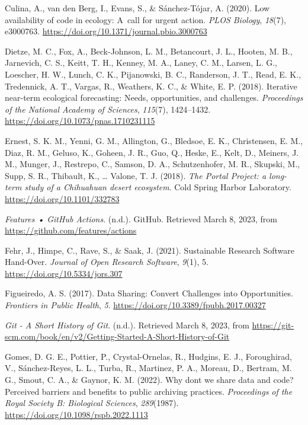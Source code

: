 \begin{CSLReferences}{1}{0}
\leavevmode{}%
Culina, A., van den Berg, I., Evans, S., \& Sánchez-Tójar, A. (2020). Low availability of code in ecology: A~call for urgent action. \emph{PLOS Biology}, \emph{18}(7), e3000763. \url{https://doi.org/10.1371/journal.pbio.3000763}

\leavevmode{}%
Dietze, M. C., Fox, A., Beck-Johnson, L. M., Betancourt, J. L., Hooten, M. B., Jarnevich, C. S., Keitt, T. H., Kenney, M. A., Laney, C. M., Larsen, L. G., Loescher, H. W., Lunch, C. K., Pijanowski, B. C., Randerson, J. T., Read, E. K., Tredennick, A. T., Vargas, R., Weathers, K. C., \& White, E. P. (2018). Iterative near-term ecological forecasting: Needs, opportunities, and challenges. \emph{Proceedings of the National Academy of Sciences}, \emph{115}(7), 1424--1432. \url{https://doi.org/10.1073/pnas.1710231115}

\leavevmode{}%
Ernest, S. K. M., Yenni, G. M., Allington, G., Bledsoe, E. K., Christensen, E. M., Diaz, R. M., Geluso, K., Goheen, J. R., Guo, Q., Heske, E., Kelt, D., Meiners, J. M., Munger, J., Restrepo, C., Samson, D. A., Schutzenhofer, M. R., Skupski, M., Supp, S. R., Thibault, K., \ldots{} Valone, T. J. (2018). \emph{The Portal Project: a long-term study of a Chihuahuan desert ecosystem}. Cold Spring Harbor Laboratory. \url{https://doi.org/10.1101/332783}

\leavevmode{}%
\emph{Features • GitHub Actions}. (n.d.). GitHub. Retrieved March 8, 2023, from \url{https://github.com/features/actions}

\leavevmode{}%
Fehr, J., Himpe, C., Rave, S., \& Saak, J. (2021). Sustainable Research Software Hand-Over. \emph{Journal of Open Research Software}, \emph{9}(1), 5. \url{https://doi.org/10.5334/jors.307}

\leavevmode{}%
Figueiredo, A. S. (2017). Data Sharing: Convert Challenges into Opportunities. \emph{Frontiers in Public Health}, \emph{5}. \url{https://doi.org/10.3389/fpubh.2017.00327}

\leavevmode{}%
\emph{Git - A Short History of Git}. (n.d.). Retrieved March 8, 2023, from \url{https://git-scm.com/book/en/v2/Getting-Started-A-Short-History-of-Git}

\leavevmode{}%
Gomes, D. G. E., Pottier, P., Crystal-Ornelas, R., Hudgins, E. J., Foroughirad, V., Sánchez-Reyes, L. L., Turba, R., Martinez, P. A., Moreau, D., Bertram, M. G., Smout, C. A., \& Gaynor, K. M. (2022). Why don\textquotesingle t we share data and code? Perceived barriers and benefits to public archiving practices. \emph{Proceedings of the Royal Society B: Biological Sciences}, \emph{289}(1987). \url{https://doi.org/10.1098/rspb.2022.1113}


\end{CSLReferences}
